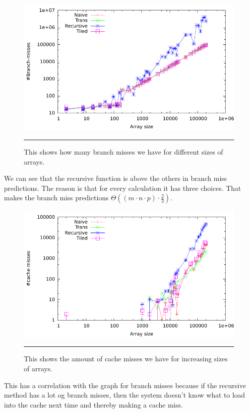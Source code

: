 \begin{figure}[htbp]
	\centering
		\includegraphics[width=\textwidth]{./Figures/Project2a/Branch_misses.pdf}
		\rule{35em}{0.5pt}
	\caption[Branch misses]{
	This shows how many branch misses we have for different sizes of arrays.
	}
	\label{fig:Branch_misses_p2a}
\end{figure}
We can see that the recursive function is above the others in branch miss predictions.
The reason is that for every calculation it has three choices.
That makes the branch miss predictions $ \Theta ((m\cdot n\cdot p)\cdot \frac{2}{3}) $.

\begin{figure}[htbp]
	\centering
		\includegraphics[width=\textwidth]{./Figures/Project2a/Cache_misses.pdf}
		\rule{35em}{0.5pt}
	\caption[Cache misses]{
	This shows the amount of cache misses we have for increasing sizes of arrays.
	}
	\label{fig:Cache_misses_p2a}
\end{figure}
This has a correlation with the graph for branch misses because if the recursive method has a lot og branch misses, then the system doesn't know what to load into the cache next time and thereby making a cache miss.



